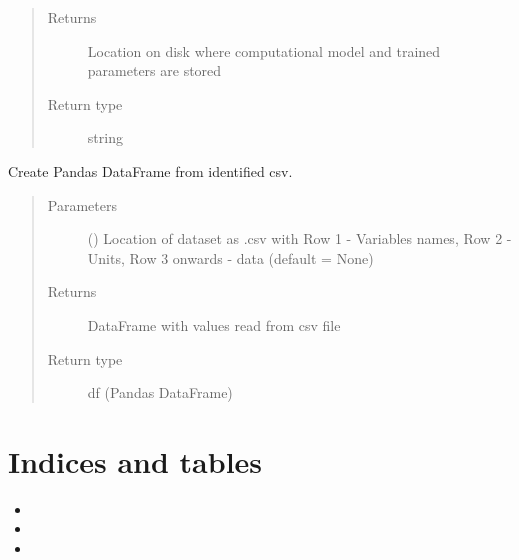\documentclass[letterpaper,10pt,english]{sphinxmanual}
\begin{document}
\begin{fulllineitems}
\begin{fulllineitems}
\begin{quote}
\begin{description}
\begin{itemize}
\end{itemize}

\item[{Returns}] \leavevmode
Location on disk where computational model and trained parameters are stored

\item[{Return type}] \leavevmode
string

\end{description}\end{quote}

\end{fulllineitems}


\begin{fulllineitems}
\label{\detokenize{index:kChain.kChainModel.getDataset}}
Create Pandas DataFrame from identified csv.
\begin{quote}\begin{description}
\item[{Parameters}] \leavevmode
{} () \textendash{} Location of dataset as .csv with Row 1 - Variables names,
Row 2 - Units, Row 3 onwards - data (default = None)

\item[{Returns}] \leavevmode
DataFrame with values read from csv file

\item[{Return type}] \leavevmode
df (Pandas DataFrame)

\end{description}\end{quote}

\end{fulllineitems}


\end{fulllineitems}



\chapter{Indices and tables}
\label{\detokenize{index:indices-and-tables}}\begin{itemize}
\item {} 

\item {} 

\item {} 

\end{itemize}
\end{document}
